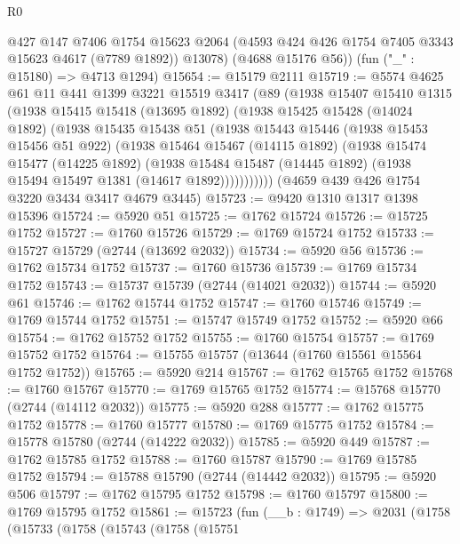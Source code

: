\begin{lexlean}{R0}
\begin{coremodule}
        @427
        @147
        @7406
        @1754
        @15623
        @2064
        (@4593 @424 @426 @1754 @7405 @3343 @15623 @4617 (@7789 @1892))
        @13078)
      (@4688 @15176 @56))
    (fun ("_" : @15180) => @4713 @1294)
@15654 := @15179 @2111
@15719 := @5574
    @4625
    @61
    @11
    @441
    @1399
    @3221
    @15519
    @3417
    (@89
      (@1938
        @15407
        @15410
        @1315
        (@1938
          @15415
          @15418
          (@13695 @1892)
          (@1938
            @15425
            @15428
            (@14024 @1892)
            (@1938
              @15435
              @15438
              @51
              (@1938
                @15443
                @15446
                (@1938 @15453 @15456 @51 @922)
                (@1938
                  @15464
                  @15467
                  (@14115 @1892)
                  (@1938
                    @15474
                    @15477
                    (@14225 @1892)
                    (@1938
                      @15484
                      @15487
                      (@14445 @1892)
                      (@1938 @15494 @15497 @1381 (@14617 @1892)))))))))))
    (@4659 @439 @426 @1754 @3220 @3434 @3417 @4679 @3445)
@15723 := @9420 @1310 @1317 @1398 @15396
@15724 := @5920 @51
@15725 := @1762 @15724
@15726 := @15725 @1752
@15727 := @1760 @15726
@15729 := @1769 @15724 @1752
@15733 := @15727 @15729 (@2744 (@13692 @2032))
@15734 := @5920 @56
@15736 := @1762 @15734 @1752
@15737 := @1760 @15736
@15739 := @1769 @15734 @1752
@15743 := @15737 @15739 (@2744 (@14021 @2032))
@15744 := @5920 @61
@15746 := @1762 @15744 @1752
@15747 := @1760 @15746
@15749 := @1769 @15744 @1752
@15751 := @15747 @15749 @1752
@15752 := @5920 @66
@15754 := @1762 @15752 @1752
@15755 := @1760 @15754
@15757 := @1769 @15752 @1752
@15764 := @15755 @15757 (@13644 (@1760 @15561 @15564 @1752 @1752))
@15765 := @5920 @214
@15767 := @1762 @15765 @1752
@15768 := @1760 @15767
@15770 := @1769 @15765 @1752
@15774 := @15768 @15770 (@2744 (@14112 @2032))
@15775 := @5920 @288
@15777 := @1762 @15775 @1752
@15778 := @1760 @15777
@15780 := @1769 @15775 @1752
@15784 := @15778 @15780 (@2744 (@14222 @2032))
@15785 := @5920 @449
@15787 := @1762 @15785 @1752
@15788 := @1760 @15787
@15790 := @1769 @15785 @1752
@15794 := @15788 @15790 (@2744 (@14442 @2032))
@15795 := @5920 @506
@15797 := @1762 @15795 @1752
@15798 := @1760 @15797
@15800 := @1769 @15795 @1752
@15861 := @15723
    (fun (__b : @1749) =>
    @2031
      (@1758
        (@15733
          (@1758
            (@15743
              (@1758
                (@15751

\end{coremodule}
\end{lexlean}
